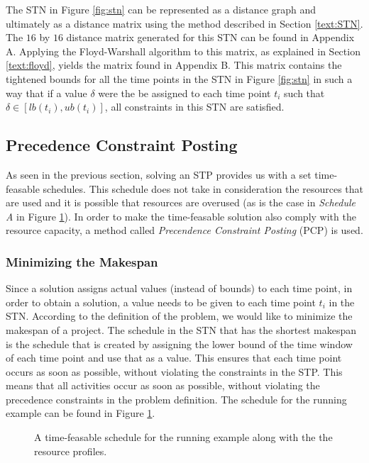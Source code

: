 \documentclass{article}
\theoremstyle{definition}
\newcommand{\inputtikz}[1]{}
\begin{document}
The STN in Figure \ref{fig:stn} can be represented as a distance graph and ultimately as a distance matrix using the method described in Section \ref{text:STN}. The $16$ by $16$ distance matrix generated for this STN can be found in Appendix A. Applying the Floyd-Warshall algorithm to this matrix, as explained in Section \ref{text:floyd}, yields the matrix found in Appendix B. This matrix contains the tightened bounds for all the time points in the STN in Figure \ref{fig:stn} in such a way that if a value $\delta$ were the be assigned to each time point $t_i$ such that $\delta \in [lb(t_i), ub(t_i)]$, all constraints in this STN are satisfied.

\subsection{Precedence Constraint Posting}
\label{text:PCP}
As seen in the previous section, solving an STP provides us with a set time-feasable schedules. 
This schedule does not take in consideration the resources that are used and it is possible that resources are overused (as is the case in \emph{Schedule A} in Figure \ref{fig:resource_graph}). 
In order to make the time-feasable solution also comply with the resource capacity, a method called \emph{Precendence Constraint Posting} (PCP) is used. 

\subsubsection{Minimizing the Makespan}
Since a solution assigns actual values (instead of bounds) to each time point, in order to obtain a solution, a value needs to be given to each time point $t_i$ in the STN. According to the definition of the problem, we would like to minimize the makespan of a project. The schedule in the STN that has the shortest makespan is the schedule that is created by assigning the lower bound of the time window of each time point and use that as a value. This ensures that each time point occurs as soon as possible, without violating the constraints in the STP. This means that all activities occur as soon as possible, without violating the precedence constraints in the problem definition. The schedule for the running example can be found in Figure \ref{fig:resource_graph}.

\begin{figure}[h]
	\centering
	\inputtikz{schedule_infeasible_profile}
	\caption{A time-feasable schedule for the running example along with the the resource profiles.}
	\label{fig:resource_graph}
\end{figure}
\end{document}
